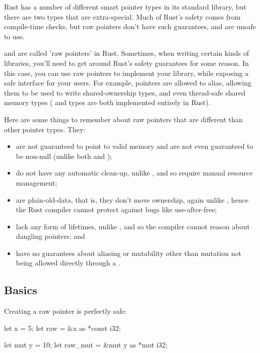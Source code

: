 Rust has a number of different smart pointer types in its standard library, but there are two types that are extra-special. Much 
of Rust's safety comes from compile-time checks, but raw pointers don't have such guarantees, and are unsafe to use.

\blank

 and  are called 'raw pointers' in Rust. Sometimes, when writing certain kinds of libraries, you'll 
need to get around Rust's safety guarantees for some reason. In this case, you can use raw pointers to implement your library, 
while exposing a safe interface for your users. For example, \code{*} pointers are allowed to alias, allowing them to be used to 
write shared-ownership types, and even thread-safe shared memory types ( and  types are both implemented 
entirely in Rust).

\blank

Here are some things to remember about raw pointers that are different than other pointer types. They:

\begin{itemize}
  \item{are not guaranteed to point to valid memory and are not even guaranteed to be non-null (unlike both  and \code{\&});}
  \item{do not have any automatic clean-up, unlike , and so require manual resource management;}
  \item{are plain-old-data, that is, they don't move ownership, again unlike , hence the Rust compiler cannot protect against 
      bugs like use-after-free;}
  \item{lack any form of lifetimes, unlike \code{\&}, and so the compiler cannot reason about dangling pointers; and}
  \item{have no guarantees about aliasing or mutability other than mutation not being allowed directly through a .}
\end{itemize}

\subsection*{Basics}

Creating a raw pointer is perfectly safe:

\begin{rustc}
let x = 5;
let raw = &x as *const i32;

let mut y = 10;
let raw_mut = &mut y as *mut i32;
\end{rustc}

